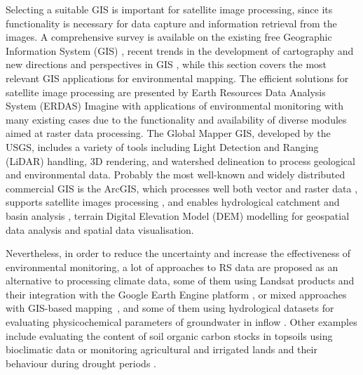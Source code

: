 \documentclass[land,article,accept,pdftex,moreauthors]{Definitions/mdpi}
\begin{document}
Selecting a suitable GIS is important for {satellite image processing}, since its functionality is necessary for data {capture and information retrieval from the images}. A comprehensive survey is available on the existing free {Geographic Information System (GIS)} \cite{LEIDIG201549,CHEN2010253}, recent trends in the development of cartography \cite{WangWu} and new directions and perspectives in GIS \cite{Lietal2022}, while this section covers the most relevant GIS applications for environmental mapping. The efficient solutions for satellite image processing are presented by Earth Resources Data Analysis System (ERDAS) Imagine with applications of environmental monitoring \cite{FALAKI2020363} with many existing cases due to the functionality and availability of diverse modules aimed at raster data processing. The Global Mapper GIS, developed by the USGS, includes a variety of tools including Light Detection and Ranging (LiDAR) handling, 3D rendering, and watershed delineation to process geological and environmental data. Probably the most well-known and widely distributed commercial GIS is the ArcGIS, which processes well both vector and raster data \cite{AlDjazouli}, supports satellite images processing \cite{SESNIE20082145}, and enables hydrological catchment and basin analysis \cite{Nkiaka}, terrain Digital Elevation Model (DEM) modelling for geospatial data analysis \cite{Kay} and spatial data visualisation. 

Nevertheless, in order to reduce the uncertainty and increase the effectiveness of environmental monitoring, a lot of approaches to RS data are proposed as an alternative to processing climate data, some of them using Landsat products \cite{Lemenkova202315} and their integration with the Google Earth Engine platform \cite{rs15133257}, or mixed approaches with GIS-based mapping~\cite{SAIDI20091683,ANANE201236,Lemenkova202217}, and some of them using hydrological datasets for evaluating physicochemical parameters of groundwater in inflow \cite{BENBRAHIM2021104224}. Other examples include evaluating the content of soil organic carbon stocks in topsoils using bioclimatic data \cite{BAHRI2022e00561} or monitoring agricultural and irrigated lands and their behaviour during drought periods \cite{MOHAMED2023e01766}. 
\end{document}

